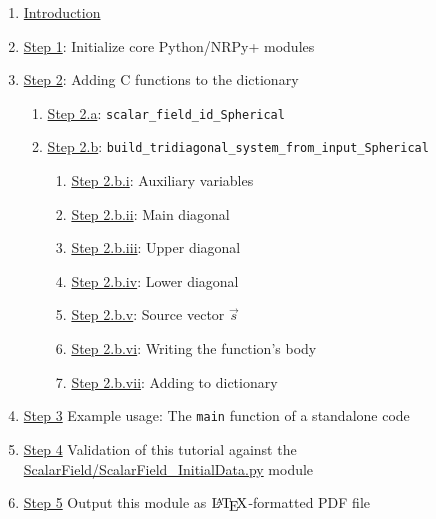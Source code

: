 \documentclass[landscape,letterpaper,10pt,english]{article}
\providecommand{\tightlist}{%
      \setlength{\itemsep}{0pt}\setlength{\parskip}{0pt}}
\let\Oldlatex\LaTeX
\renewcommand{\LaTeX}{\textrm{\Oldlatex}}
\begin{document}
\begin{enumerate}
\def\labelenumi{\arabic{enumi}.}
\setcounter{enumi}{-1}
\tightlist
\item
  \hyperref[introduction]{Introduction}
\item
  \hyperref[initialize_nrpy]{Step 1}: Initialize core Python/NRPy+
  modules
\item
  \hyperref[adding_functions_to_dictionary]{Step 2}: Adding C functions
  to the dictionary

  \begin{enumerate}
  \def\labelenumii{\arabic{enumii}.}
  \tightlist
  \item
    \hyperref[scalar_field_id_spherical]{Step 2.a}:
    \texttt{scalar\_field\_id\_Spherical}
  \item
    \hyperref[build_tridiagonal_system_from_input_spherical]{Step 2.b}:
    \texttt{build\_tridiagonal\_system\_from\_input\_Spherical}

    \begin{enumerate}
    \def\labelenumiii{\arabic{enumiii}.}
    \tightlist
    \item
      \hyperref[tridiag_system_aux_vars]{Step 2.b.i}: Auxiliary
      variables
    \item
      \hyperref[tridiag_system_main_diag]{Step 2.b.ii}: Main diagonal
    \item
      \hyperref[tridiag_system_upper_diag]{Step 2.b.iii}: Upper diagonal
    \item
      \hyperref[tridiag_system_lower_diag]{Step 2.b.iv}: Lower diagonal
    \item
      \hyperref[tridiag_system_source_vector]{Step 2.b.v}: Source vector
      \(\vec{s}\)
    \item
      \hyperref[tridiag_system_func_body]{Step 2.b.vi}: Writing the
      function's body
    \item
      \hyperref[tridiag_system_add_to_dict]{Step 2.b.vii}: Adding to
      dictionary
    \end{enumerate}
  \end{enumerate}
\item
  \hyperref[main_standalone]{Step 3} Example usage: The \texttt{main}
  function of a standalone code
\item
  \hyperref[validation]{Step 4} Validation of this tutorial against the
  \href{../edit/ScalarField/ScalarField_InitialData.py}{ScalarField/ScalarField\_InitialData.py}
  module
\item
  \hyperref[output_to_pdf]{Step 5} Output this module as
  \(\LaTeX\)-formatted PDF file
\end{enumerate}
\end{document}
